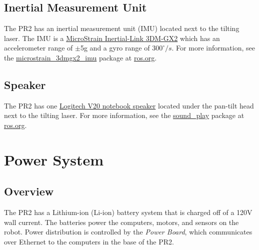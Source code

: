 \subsection{Inertial Measurement Unit}
The PR2 has an inertial measurement unit (IMU) located next to the tilting
laser. The IMU is a \href{http://www.microstrain.com/3dm-gx2.aspx}{MicroStrain
  Inertial-Link 3DM-GX2} which has an accelerometer range of $\pm$5g and a gyro
range of $300^\circ/s$. For more information, see the
\href{http://www.ros.org/wiki/microstrain_3dmgx2_imu}{microstrain\_3dmgx2\_imu}
package at \href{http://www.ros.org}{ros.org}.

\subsection{Speaker}
The PR2 has one
\href{http://www.logitech.com/index.cfm/speakers_audio/home_pc_speakers/devices/199&cl=us,en}{Logitech
  V20 notebook speaker} located under the pan-tilt head next to the tilting
laser. For more information, see the
\href{http://www.ros.org/wiki/sound_play}{sound\_play} package at
\href{http://www.ros.org}{ros.org}.

\section{Power System}
\subsection{Overview}
The PR2 has a Lithium-ion (Li-ion) battery system that is charged off of a 120V
wall current. The batteries power the computers, motors, and sensors on the
robot.  Power distribution is controlled by the \emph{Power Board}, which
communicates over Ethernet to the computers in the base of the PR2.
